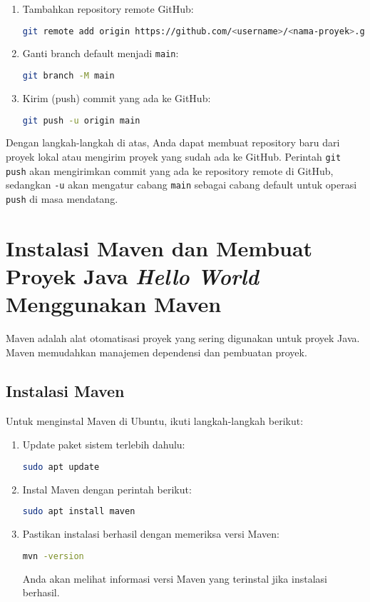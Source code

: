 \begin{enumerate}
	\item Tambahkan repository remote GitHub:
	\begin{lstlisting}[language=bash]
		git remote add origin https://github.com/<username>/<nama-proyek>.git
	\end{lstlisting}
	
	\item Ganti branch default menjadi \texttt{main}:
	\begin{lstlisting}[language=bash]
		git branch -M main
	\end{lstlisting}
	
	\item Kirim (push) commit yang ada ke GitHub:
	\begin{lstlisting}[language=bash]
		git push -u origin main
	\end{lstlisting}
\end{enumerate}

Dengan langkah-langkah di atas, Anda dapat membuat repository baru dari proyek lokal atau mengirim proyek yang sudah ada ke GitHub. Perintah \texttt{git push} akan mengirimkan commit yang ada ke repository remote di GitHub, sedangkan \texttt{-u} akan mengatur cabang \texttt{main} sebagai cabang default untuk operasi \texttt{push} di masa mendatang.


\section{Instalasi Maven dan Membuat Proyek Java \textit{Hello World} Menggunakan Maven}

Maven adalah alat otomatisasi proyek yang sering digunakan untuk proyek Java. Maven memudahkan manajemen dependensi dan pembuatan proyek.

\subsection{Instalasi Maven}

Untuk menginstal Maven di Ubuntu, ikuti langkah-langkah berikut:

\begin{enumerate}
	\item Update paket sistem terlebih dahulu:
	\begin{lstlisting}[language=bash]
		sudo apt update
	\end{lstlisting}
	
	\item Instal Maven dengan perintah berikut:
	\begin{lstlisting}[language=bash]
		sudo apt install maven
	\end{lstlisting}
	
	\item Pastikan instalasi berhasil dengan memeriksa versi Maven:
	\begin{lstlisting}[language=bash]
		mvn -version
	\end{lstlisting}
	Anda akan melihat informasi versi Maven yang terinstal jika instalasi berhasil.
\end{enumerate}

